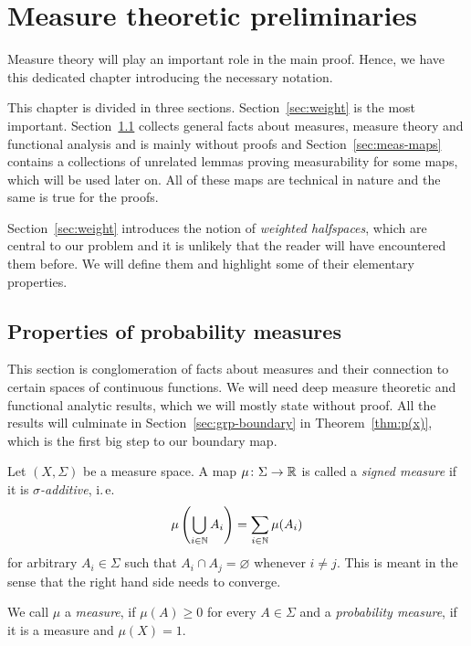 \section{Measure theoretic preliminaries}
\label{sec:measure}

Measure theory will play an important role in the main proof. Hence, we have this dedicated chapter introducing the necessary notation.

This chapter is divided in three sections. Section~\ref{sec:weight} is the most important. Section~\ref{sec:prob} collects general facts about measures, measure theory and functional analysis and is main\-ly without proofs and Section~\ref{sec:meas-maps} contains a collections of unrelated lemmas proving measurability for some maps, which will be used later on. All of these maps are technical in nature and the same is true for the proofs.

Section~\ref{sec:weight} introduces the notion of \emph{weighted halfspaces}, which are central to our problem and it is unlikely that the reader will have encountered them before. We will define them and highlight some of their elementary properties.

\subsection{Properties of probability measures}
\label{sec:prob}

This section is conglomeration of facts about measures and their connection to certain spaces of continuous functions. We will need deep measure theoretic and functional analytic results, which we will mostly state without proof. All the results will culminate in Section~\ref{sec:grp-boundary} in Theorem~\ref{thm:p(x)}, which is the first big step to our boundary map.

\begin{defin}
  Let \((X, \Sigma)\) be a measure space. A map \(\mu \colon \Sigma \to \mathbb{R}\) is called a \emph{signed measure} if it is \emph{\(\sigma\)-additive}, i.\,e.
  \[
    \mu\left(\bigcup_{i \in \mathbb{N}}A_i \right) = \sum_{i \in \mathbb{N}} \mu(A_i)
  \]
  for arbitrary \(A_i \in \Sigma\) such that \(A_i \cap A_j = \varnothing\) whenever \(i \neq j\). This is meant in the sense that the right hand side needs to converge.

  We call \(\mu\) a \emph{measure}, if \(\mu(A) \geq 0\) for every \(A \in \Sigma\) and a \emph{probability measure}, if it is a measure and \(\mu(X) = 1\).
\end{defin}

